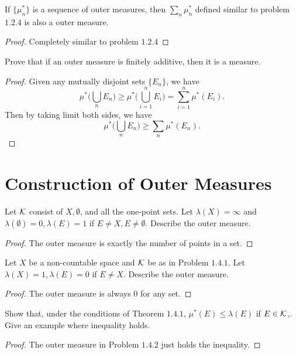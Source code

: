 \begin{pro}%
	If $\{\mu_n^*\}$ is a sequence of outer measures, then $\sum_n \mu_n^*$ defined similar to problem $1.2.4$ is also a outer measure.
\end{pro}
\begin{proof}
	Completely similar to problem $1.2.4$
\end{proof}

\begin{pro}%
	Prove that if an outer measure is finitely additive, then it is a measure.
\end{pro}
\begin{proof}
	Given any mutually disjoint sets $\{E_n\}$, we have
	\[\mu^*\bigg(\bigcup_n E_n\bigg)\geq \mu^*\bigg(\bigcup_{i=1}^n E_i\bigg)=\sum_{i=1}^n \mu^*(E_i).\]
	Then by taking limit both sides, we have
	\[\mu^*\bigg(\bigcup_n E_n\bigg)\geq\sum_n \mu^*(E_n).\]
\end{proof}

\section{Construction of Outer Measures}
\begin{pro}%
	Let $\mathcal{K}$ consist of $X,\emptyset$, and all the one-point sets. Let $\lambda(X)=\infty$ and $\lambda(\emptyset)=0,\lambda(E)=1$ if $E\neq X, E\neq \emptyset$. Describe the outer measure.
\end{pro}
\begin{proof}
	The outer measure is exactly the number of points in a set.
\end{proof}

\begin{pro}%
	Let $X$ be a non-countable space and $\mathcal{K}$ be as in Problem $1.4.1$. Let $\lambda(X)=1,\lambda(E)=0$ if $E\neq X$. Describe the outer measure.
\end{pro}
\begin{proof}
	The outer measure is always $0$ for any set.
\end{proof}

\begin{pro}%
	Show that, under the conditions of Theorem $1.4.1$, $\mu^*(E)\leq \lambda(E)$ if $E\in \mathcal{K}$,. Give an example where inequality holds.
\end{pro}
\begin{proof}
	The outer measure in Problem $1.4.2$ just holds the inequality.
\end{proof}

